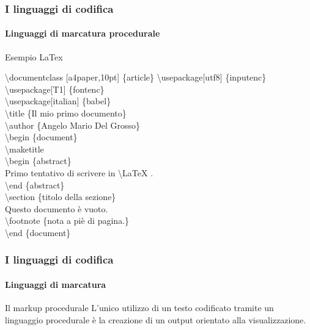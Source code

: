 \documentclass{beamer}
\begin{document}
\begin{frame}
	\frametitle{I linguaggi di codifica}
	\framesubtitle{Linguaggi di marcatura procedurale}
	\addtocounter{nframe}{1}

	\begin{block}{Esempio LaTex}
        \begin{tiny}
			\textbackslash documentclass [a4paper,10pt] \{article\} 
			\textbackslash usepackage[utf8] \{inputenc\}\\
			\textbackslash usepackage[T1] \{fontenc\}\\
			\textbackslash usepackage[italian] \{babel\}\\
			\textbackslash title \{Il mio primo documento\}\\
			\textbackslash author \{Angelo Mario Del Grosso\} \\
			\textbackslash begin \{document\}\\
			\textbackslash maketitle\\
			\textbackslash begin \{abstract\}\\
			 Primo tentativo di scrivere in \textbackslash LaTeX .\\
			\textbackslash end \{abstract\}\\
			\textbackslash section \{titolo della sezione\}\\
			Questo documento è vuoto.\\
			\textbackslash footnote \{nota a piè di pagina.\}\\
			\textbackslash end \{document\}
		\end{tiny}
	\end{block}

\end{frame}

\begin{frame}
	\frametitle{I linguaggi di codifica}
	\framesubtitle{Linguaggi di marcatura}
	\addtocounter{nframe}{1}

	\begin{block}{Il markup procedurale}
		L’unico utilizzo di un testo codificato tramite un linguaggio procedurale è la creazione di un output orientato alla visualizzazione.
	\end{block}
\end{frame}
\end{document}
